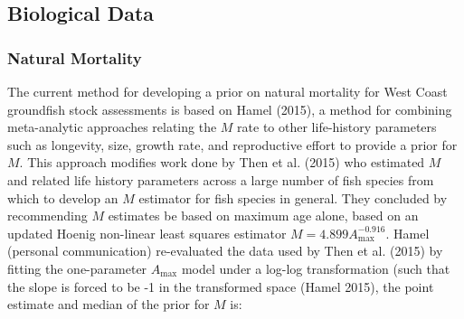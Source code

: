 \documentclass[11pt,
  english,
  a4paper,
]{article}
\begin{document}
\leavevmode\tagmcend\tagstructend\par


\hypertarget{bio-data}{%
\subsection{Biological Data}\label{bio-data}}

\leavevmode\tagmcend\tagstructend


\hypertarget{natural-mortality}{%
\subsubsection{Natural Mortality}\label{natural-mortality}}

\leavevmode\tagmcend\tagstructend


The current method for developing a prior on natural mortality for West Coast groundfish stock assessments is based on Hamel {(2015)\leavevmode\tagmcend\tagstructend}, a method for combining meta-analytic approaches relating the {\(M\)\leavevmode\tagmcend\tagstructend} rate to other life-history parameters such as longevity, size, growth rate, and reproductive effort to provide a prior for {\(M\)\leavevmode\tagmcend\tagstructend}. This approach modifies work done by Then et al. {(2015)\leavevmode\tagmcend\tagstructend} who estimated {\(M\)\leavevmode\tagmcend\tagstructend} and related life history parameters across a large number of fish species from which to develop an {\(M\)\leavevmode\tagmcend\tagstructend} estimator for fish species in general. They concluded by recommending {\(M\)\leavevmode\tagmcend\tagstructend} estimates be based on maximum age alone, based on an updated Hoenig non-linear least squares estimator {\(M = 4.899A^{-0.916}_{\text{max}}\)\leavevmode\tagmcend\tagstructend}. Hamel (personal communication) re-evaluated the data used by Then et al. {(2015)\leavevmode\tagmcend\tagstructend} by fitting the one-parameter {\(A_{\text{max}}\)\leavevmode\tagmcend\tagstructend} model under a log-log transformation (such that the slope is forced to be -1 in the transformed space {(Hamel 2015)\leavevmode\tagmcend\tagstructend}, the point estimate and median of the prior for {\(M\)\leavevmode\tagmcend\tagstructend} is:
\end{document}

